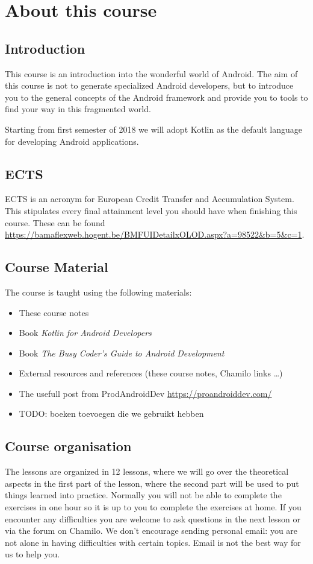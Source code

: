 \chapter{About this course}

\section{Introduction}
This course is an introduction into the wonderful world of Android. The aim of this course is not to generate specialized Android developers, but to introduce you to the general concepts of the Android framework and provide you to tools to find your way in this fragmented world. 

Starting from first semester of 2018 we will adopt Kotlin as the default language for developing Android applications. 

\section{ECTS}
ECTS is an acronym for European Credit Transfer and Accumulation System. This stipulates every final attainment level you should have when finishing this course. These can be found \href{here}{https://bamaflexweb.hogent.be/BMFUIDetailxOLOD.aspx?a=98522\&b=5\&c=1}. 

\section{Course Material}
The course is taught using the following materials:

\begin{itemize}
	\item These course notes
	\item Book \textit{Kotlin for Android Developers} \cite{Leiva2018}
	\item Book  \textit{The Busy Coder's Guide to Android Development} \cite{murphymarkl.2017}
	\item External resources and references (these course notes, Chamilo links \dots)
	\item The usefull post from ProdAndroidDev \url{https://proandroiddev.com/}
	\item TODO: boeken toevoegen die we gebruikt hebben
\end{itemize}

\section{Course organisation}
The lessons are organized in 12 lessons, where we will go over the theoretical aspects in the first part of the lesson, where the second part will be used to put things learned into practice. Normally you will not be able to complete the exercises in one hour so it is up to you to complete the exercises at home. If you encounter any difficulties  you are welcome to ask questions in the next lesson or via the forum on Chamilo. We don't encourage sending personal email: you are
not alone in having difficulties with certain topics. Email is not the best way for us to help you.

